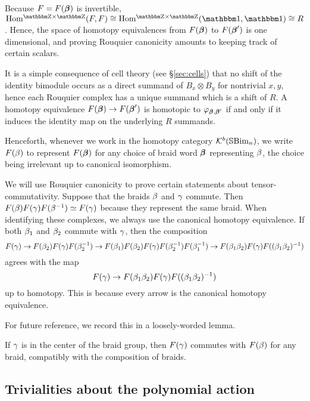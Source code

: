 \begin{remark} Because $F = F(\boldsymbol{\beta})$ is invertible, $\Homgg(F,F) \cong \Homgg(\one,\one) \cong R$. Hence, the space of homotopy equivalences from $F(\boldsymbol{\beta})$ to $F(\boldsymbol{\beta}')$ is one dimensional, and proving Rouquier canonicity amounts to keeping track of certain scalars.

It is a simple consequence of cell theory (see \S\ref{sec:cells}) that no shift of the identity bimodule occurs as a direct summand of $B_x\otimes B_y$ for nontrivial $x,y$, hence each Rouquier complex has a unique summand which is a shift of $R$. A homotopy equivalence $F(\boldsymbol{\beta}) \rightarrow F(\boldsymbol{\beta}')$ is homotopic to $\varphi_{\boldsymbol{\beta},\boldsymbol{\beta}'}$ if and only if it induces
the identity map on the underlying $R$ summands. \end{remark}

Henceforth, whenever we work in the homotopy category ${\mathcal{K}}^b({\mathbb{S}}{\rm Bim }_n)$, we write $F(\beta)$ to represent $F(\boldsymbol{\beta})$ for any choice of braid word $\boldsymbol{\beta}$ representing $\beta$, the choice
being irrelevant up to canonical isomorphism.

We will use Rouquier canonicity to prove certain statements about tensor-commutativity. Suppose that the braids $\beta$ and $\gamma$ commute. Then $F(\beta) F(\gamma) F(\beta^{-1}) \simeq F(\gamma)$ because
they represent the same braid. When identifying these complexes, we always use the canonical homotopy equivalence. If both $\beta_1$ and $\beta_2$ commute with $\gamma$, then the composition
\begin{equation} \label{eq:conjblah1} F(\gamma) \rightarrow F(\beta_2) F(\gamma) F(\beta_2^{-1}) \rightarrow F(\beta_1) F(\beta_2) F(\gamma) F(\beta_2^{-1}) F(\beta_1^{-1}) \rightarrow F(\beta_1 \beta_2) F(\gamma) F((\beta_1 \beta_2)^{-1})\end{equation} agrees
with the map \begin{equation} \label{eq:conjblah2} F(\gamma) \rightarrow F(\beta_1 \beta_2) F(\gamma) F((\beta_1\beta_2)^{-1}) \end{equation} up to homotopy. This is because every arrow is the canonical homotopy
equivalence. 

For future reference, we record this in a loosely-worded lemma.

\begin{lemma} \label{lem:centerofbraidgroup} If $\gamma$ is in the center of the braid group, then $F(\gamma)$ commutes with $F(\beta)$ for any braid, compatibly with the composition of braids. \end{lemma}
	
\subsection{Trivialities about the polynomial action}
\label{subsec:trivial}

